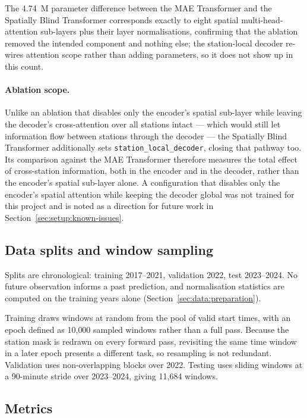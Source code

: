 The 4.74~M parameter difference between the MAE Transformer and the
Spatially Blind Transformer corresponds exactly to eight spatial
multi-head-attention sub-layers plus their layer normalisations, confirming
that the ablation removed the intended component and nothing else; the
station-local decoder re-wires attention scope rather than adding
parameters, so it does not show up in this count.

\paragraph{Ablation scope.}
\label{sec:method:ablations}

Unlike an ablation that disables only the encoder's spatial sub-layer while
leaving the decoder's cross-attention over all stations intact --- which
would still let information flow between stations through the decoder ---
the Spatially Blind Transformer additionally sets
\texttt{station\_local\_decoder}, closing that pathway too. Its comparison
against the MAE Transformer therefore measures the total effect of
cross-station information, both in the encoder and in the decoder, rather
than the encoder's spatial sub-layer alone. A configuration that disables
only the encoder's spatial attention while keeping the decoder global was
not trained for this project and is noted as a direction for future work in
Section~\ref{sec:setup:known-issues}.

\subsection{Data splits and window sampling}
\label{sec:setup:splits}

Splits are chronological: training 2017--2021, validation 2022, test
2023--2024. No future observation informs a past prediction, and normalisation
statistics are computed on the training years alone
(Section~\ref{sec:data:preparation}).

Training draws windows at random from the pool of valid start times, with an
epoch defined as 10{,}000 sampled windows rather than a full pass. Because the
station mask is redrawn on every forward pass, revisiting the same time window
in a later epoch presents a different task, so resampling is not redundant.
Validation uses non-overlapping blocks over 2022. Testing uses sliding windows
at a 90-minute stride over 2023--2024, giving 11{,}684 windows.

\subsection{Metrics}
\label{sec:setup:metrics}

